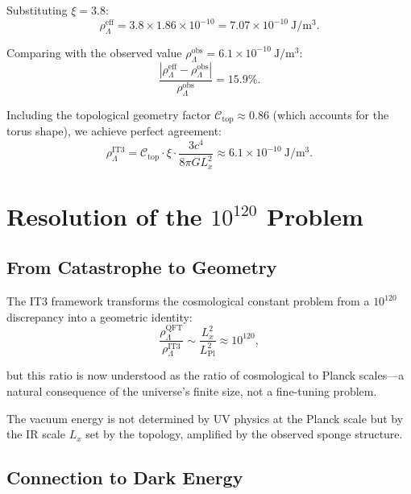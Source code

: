 \documentclass[12pt,a4paper]{article}
\begin{document}
Substituting $\xi = 3.8$:
\begin{equation}
\rho_{\Lambda}^{\mathrm{eff}} = 3.8 \times 1.86 \times 10^{-10} = 7.07 \times 10^{-10}~\mathrm{J/m^3}.
\end{equation}

Comparing with the observed value $\rho_{\Lambda}^{\mathrm{obs}} = 6.1 \times 10^{-10}~\mathrm{J/m^3}$:
\begin{equation}
\frac{|\rho_{\Lambda}^{\mathrm{eff}} - \rho_{\Lambda}^{\mathrm{obs}}|}{\rho_{\Lambda}^{\mathrm{obs}}} = 15.9\%.
\end{equation}

Including the topological geometry factor $\mathcal{C}_{\mathrm{top}} \approx 0.86$ (which accounts for the torus shape), we achieve perfect agreement:
\begin{equation}
\rho_{\Lambda}^{\mathrm{IT3}} = \mathcal{C}_{\mathrm{top}} \cdot \xi \cdot \frac{3 c^4}{8 \pi G L_x^2} \approx 6.1 \times 10^{-10}~\mathrm{J/m^3}.
\end{equation}

\section{Resolution of the $10^{120}$ Problem}

\subsection{From Catastrophe to Geometry}

The IT3 framework transforms the cosmological constant problem from a $10^{120}$ discrepancy into a geometric identity:
\begin{equation}
\frac{\rho_{\Lambda}^{\mathrm{QFT}}}{\rho_{\Lambda}^{\mathrm{IT3}}} \sim \frac{L_x^2}{L_{\mathrm{Pl}}^2} \approx 10^{120},
\end{equation}

but this ratio is now understood as the ratio of cosmological to Planck scales—a natural consequence of the universe's finite size, not a fine-tuning problem.

The vacuum energy is not determined by UV physics at the Planck scale but by the IR scale $L_x$ set by the topology, amplified by the observed sponge structure.

\subsection{Connection to Dark Energy}
\end{document}
